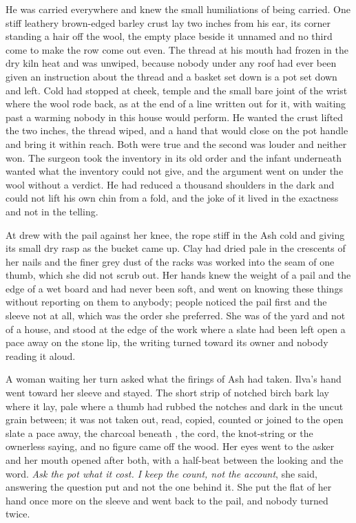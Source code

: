 He was carried everywhere and knew the small humiliations of being carried. One stiff leathery brown-edged barley crust lay two inches from his ear, its corner standing a hair off the wool, the empty place beside it unnamed and no third come to make the row come out even. The thread at his mouth had frozen in the dry kiln heat and was unwiped, because nobody under any roof had ever been given an instruction about the thread and a basket set down is a pot set down and left. Cold had stopped at cheek, temple and the small bare joint of the wrist where the wool rode back, as at the end of a line written out for it, with  waiting past a warming nobody in this house would perform. He wanted the crust lifted the two inches, the thread wiped, and a hand that would close on the pot handle and bring it within reach. Both were true and the second was louder and neither won. The surgeon took the inventory in its old order and the infant underneath wanted what the inventory could not give, and the argument went on under the wool without a verdict. He had reduced a thousand shoulders in the dark and could not lift his own chin from a fold, and the joke of it lived in the exactness and not in the telling.

At   drew with the pail against her knee, the rope stiff in the Ash cold and giving its small dry rasp as the bucket came up. Clay had dried pale in the crescents of her nails and the finer grey dust of the racks was worked into the seam of one thumb, which she did not scrub out. Her hands knew the weight of a pail and the edge of a wet board and had never been soft, and went on knowing these things without reporting on them to anybody; people noticed the pail first and the sleeve not at all, which was the order she preferred. She was of the yard and not of a house, and stood at the edge of the work where a slate had been left open a pace away on the stone lip, the writing turned toward its owner and nobody reading it aloud.

A woman waiting her turn asked what the firings of Ash had taken. Ilva's hand went toward her sleeve and stayed. The short strip of notched birch bark lay where it lay, pale where a thumb had rubbed the notches and dark in the uncut grain between; it was not taken out, read, copied, counted or joined to the open slate a pace away, the charcoal beneath , the cord, the knot-string or the ownerless saying, and no figure came off the wood. Her eyes went to the asker and her mouth opened after both, with a half-beat between the looking and the word. \emph{Ask the pot what it cost. I keep the count, not the account}, she said, answering the question put and not the one behind it. She put the flat of her hand once more on the sleeve and went back to the pail, and nobody turned twice.

